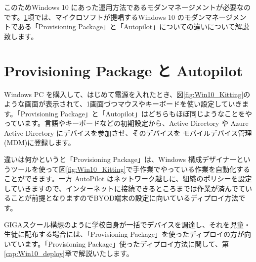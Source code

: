 このためWindows 10 にあった運用方法であるモダンマネージメントが必要なのです。\ref{sec:ProvisioningPackage1}項では、マイクロソフトが提唱するWindows 10 のモダンマネージメントである「Provisioning Package」と「Autopilot」についての違いについて解説致します。


\section{Provisioning Package と Autopilot}
\label{sec:ProvisioningPackage1}

Windows PC を購入して、はじめて電源を入れたとき、図\ref{fig:Win10_Kitting}のような画面が表示されて、1画面づつマウスやキーボードを使い設定していきます。「Provisioning Package」と「Autopilot」はどちらもほぼ同じようなことをやっています。言語やキーボードなどの初期設定から、Active Directory や Azure Active Directory にデバイスを参加させ、そのデバイスを モバイルデバイス管理(MDM)に登録します。

違いは何かというと「Provisioning Package」は、Windows 構成デザイナーというツールを使って図\ref{fig:Win10_Kitting}で手作業でやっている作業を自動化することができます。一方 AutoPilot はネットワーク越しに、組織のポリシーを設定していきますので、インターネットに接続できるところまでは作業が済んでていることが前提となりますのでBYOD端末の設定に向いているディプロイ方法です。

GIGAスクール構想のように学校自身が一括でデバイスを調達し、それを児童・生徒に配布する場合には、「Provisioning Package」を使ったディプロイの方が向いています。「Provisioning Package」使ったディプロイ方法に関して、第\ref{cap:Win10_deploy}章で解説いたします。

